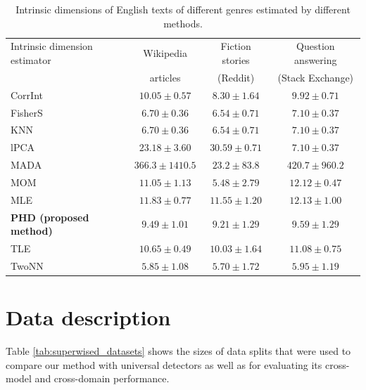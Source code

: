 \documentclass{article}
\begin{document}
\begin{table}[!t]
    \centering
        \caption{Intrinsic dimensions of English texts of different genres estimated by different methods.}
    \label{tab:various_id}
    \begin{tabular}{l|ccc}
    \toprule
         Intrinsic dimension estimator & Wikipedia  & Fiction stories & Question answering  \\
         & articles & (Reddit) & (Stack Exchange) \\
         \midrule
         \makecell[l]{CorrInt \\ \citep{grassberger1983corrint}} & $10.05 \pm 0.57$ & $8.30 \pm 1.64 $ & $9.92 \pm 0.71$\\
         FisherS \citep{albergante2019fishers} & $6.70 \pm 0.36$ & $6.54 \pm 0.71$ & $7.10 \pm 0.37 $\\
         KNN \citep{carter2010knn} & $6.70 \pm 0.36$ & $6.54 \pm 0.71$ & $7.10 \pm 0.37$ \\
         lPCA \citep{cangelosi2007lpca} & $23.18 \pm 3.60$ & $30.59 \pm 0.71$ & $7.10 \pm 0.37 $\\
         MADA \citep{Farahmand2007MADA} & $366.3 \pm 1410.5$ & $23.2 \pm 83.8$ & $ 420.7 \pm 960.2$ \\
         MOM \citep{amsaleg2018mom} & $11.05 \pm 1.13$ & $5.48 \pm 2.79$ & $ 12.12 \pm 0.47$ \\
         MLE \citep{Levina2004MLE} & $11.83 \pm 0.77$ & $11.55 \pm 1.20$ & $ 12.13 \pm 1.00$ \\
         \textbf{PHD (proposed method)} & $9.49\pm 1.01 $ & $ 9.21 \pm 1.29$ & $9.59 \pm 1.29$ \\
         TLE \citep{amsaleg2019tle} & $10.65 \pm 0.49$ & $10.03 \pm 1.64$ & $ 11.08 \pm 0.75$ \\
         TwoNN \citep{Facco2017TwoNN} & $5.85 \pm 1.08$ & $5.70 \pm 1.72$ & $ 5.95 \pm 1.19$ \\
         \bottomrule
    \end{tabular}
\end{table}

\section{Data description}

Table \ref{tab:superwised_datasets} shows the sizes of data splits that were used to compare our method with universal detectors as well as for evaluating its cross-model and cross-domain performance. 
\end{document}
